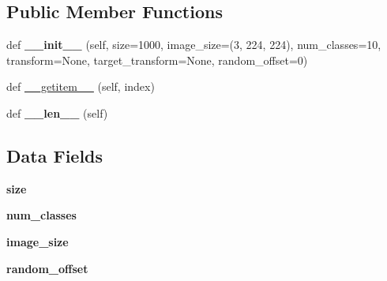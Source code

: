 \subsection*{Public Member Functions}
\begin{DoxyCompactItemize}
\item 
\mbox{\label{classtorchvision_1_1datasets_1_1fakedata_1_1FakeData_aaabf177187e3cb5a277d5f484518614b}} 
def {\bfseries \+\_\+\+\_\+init\+\_\+\+\_\+} (self, size=1000, image\+\_\+size=(3, 224, 224), num\+\_\+classes=10, transform=None, target\+\_\+transform=None, random\+\_\+offset=0)
\item 
def \hyperlink{classtorchvision_1_1datasets_1_1fakedata_1_1FakeData_aeb080af0a0bff5c62e2308cabda27ee1}{\+\_\+\+\_\+getitem\+\_\+\+\_\+} (self, index)
\item 
\mbox{\label{classtorchvision_1_1datasets_1_1fakedata_1_1FakeData_a914e021e246002011aac94a46679e72e}} 
def {\bfseries \+\_\+\+\_\+len\+\_\+\+\_\+} (self)
\end{DoxyCompactItemize}
\subsection*{Data Fields}
\begin{DoxyCompactItemize}
\item 
\mbox{\label{classtorchvision_1_1datasets_1_1fakedata_1_1FakeData_a11eef750f764f34a357201656e275f79}} 
{\bfseries size}
\item 
\mbox{\label{classtorchvision_1_1datasets_1_1fakedata_1_1FakeData_a9d33be75f5624f32de86aba7916af931}} 
{\bfseries num\+\_\+classes}
\item 
\mbox{\label{classtorchvision_1_1datasets_1_1fakedata_1_1FakeData_a61e2887f72a822881f6af59343e1f2af}} 
{\bfseries image\+\_\+size}
\item 
\mbox{\label{classtorchvision_1_1datasets_1_1fakedata_1_1FakeData_a4e301cb99ae4ae0a0c5cf11c45afd520}} 
{\bfseries random\+\_\+offset}
\end{DoxyCompactItemize}


